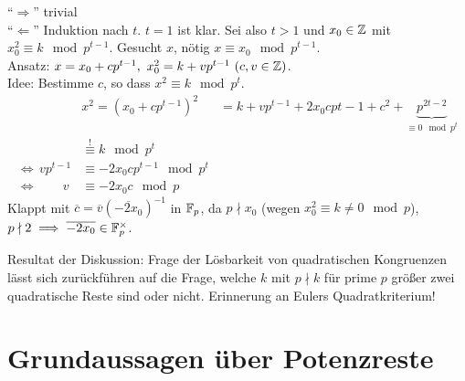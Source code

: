 \documentclass[a4paper,twoside,DIV15,BCOR12mm]{scrbook}
\begin{document}
\begin{beweis}
    "`$\Longrightarrow$"' trivial\\
    "`$\Longleftarrow$"' Induktion nach $t$. $t=1$ ist klar. Sei also
    $t>1$ und $x_0 \in \mathbb{Z}$ mit $x_0^2 \equiv k \mod p^{t-1}$.
    Gesucht $x$, nötig $x\equiv x_0 \mod p^{t-1}$.\\
    Ansatz: $x=x_0+cp^{t-1},\ x_0^2=k+vp^{t-1}\ (c,v \in \MdZ)$.\\
    Idee: Bestimme $c$, so dass $x^2\equiv k \mod p^t$.
    \begin{align*}
        &x^2=\left(x_0+cp^{t-1}\right)^2&=k+vp^{t-1}+2x_0cp{t-1}+c^2+\underbrace{p^{2t-2}}_{\equiv 0 \mod p^t}\\
                                       &\stackrel{!}{\equiv} k \mod
                                       p^t\\
        \iff\,  v p^{t-1} &\equiv -2 x_0 c p^{t-1} \mod p^t\\
        \iff \qquad v &\equiv -2x_0c\mod p
    \end{align*}
    Klappt mit $\overline c=\overline v(\overline{-2x_0})^{-1}$ in
    $\mathbb{F}_p$, da $p \nmid x_0$ (wegen $x_0^2\equiv k \neq 0 \mod
    p$), $p \nmid 2 \implies \overline{-2 x_0} \in \mathbb{F}_p^{\times}$.
\end{beweis}
Resultat der Diskussion: Frage der Lösbarkeit von quadratischen
Kongruenzen lässt sich zurückführen auf die Frage, welche $k$ mit
$p\nmid k$ für prime $p$ größer zwei quadratische Reste sind oder
nicht. Erinnerung an Eulers Quadratkriterium!

\section{Grundaussagen über Potenzreste}
\end{document}
